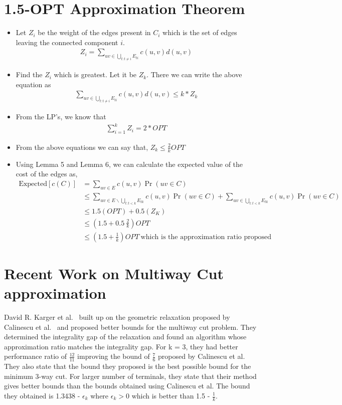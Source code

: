 \documentclass[11pt]{article}
\begin{document}
\section{1.5-OPT Approximation Theorem} 
\begin{itemize} \itemsep -3pt
    \item Let $Z_i$ be the weight of the edges present in $C_i$ which is the set of edges leaving the connected component $i$. 
        \begin{align*}
            Z_i = \sum\limits_{uv \in \bigcup\limits_{t:t \ne i}{E_{ti}}}{c(u,v)d(u,v)}
        \end{align*}
    \item Find the $Z_i$ which is greatest. Let it be $Z_k$. There we can write the above equation as 
        \begin{align*}
            \sum\limits_{uv \in \bigcup\limits_{t:t \ne i}{E_{ti}}}{c(u,v)d(u,v)} \le k * Z_k
        \end{align*}
    \item From the LP's, we know that
        \begin{align*}
            \sum\limits_{i = 1}^{k}{Z_i} = 2 * OPT
        \end{align*}
    \item From the above equations we can say that, $Z_k \le \frac{2}{k} OPT$ 
    \item Using Lemma 5 and Lemma 6, we can calculate the expected value of the cost of the edges as,
        \begin{align*}
            \text{Expected}[c(C)] &= \sum\limits_{uv \in E}{c(u,v) \Pr(uv \in C)}\\
            &\le \sum\limits_{uv \in E \backslash \bigcup\limits_{t:t<k}{E_{tk}}}{c(u,v) \Pr(uv \in C)} + \sum\limits_{uv \in \bigcup\limits_{t:t<k}{E_{tk}}}{c(u,v) \Pr(uv \in C)} \\
            &\le 1.5 (OPT) + 0.5(Z_K)\\
            &\le (1.5 + 0.5 \ \frac{2}{k})OPT\\
            &\le (1.5 + \frac{1}{k})OPT \ \text{which is the approximation ratio proposed}
        \end{align*}
\end{itemize}


\section{Recent Work on Multiway Cut approximation}
David R. Karger et al.~\cite{Karger_current} built up on the geometric relaxation proposed by Calinescu et al.~\cite{Dahlhaus} and proposed better bounds for the multiway cut problem. They determined the integrality gap of the relaxation and found an algorithm whose approximation ratio matches the integrality gap. For k = 3, they had better performance ratio of $\frac{12}{11}$ improving the bound of $\frac{7}{6}$ proposed by Calinescu et al. They also state that the bound they proposed is the best possible bound for the minimum 3-way cut. For larger number of terminals, they state that their method gives better bounds than the bounds obtained using Calinescu et al. The bound they obtained is 1.3438 - $\epsilon_k$ where $\epsilon_k > 0$ which is better than 1.5 - $\frac{1}{k}$. 
\end{document}

